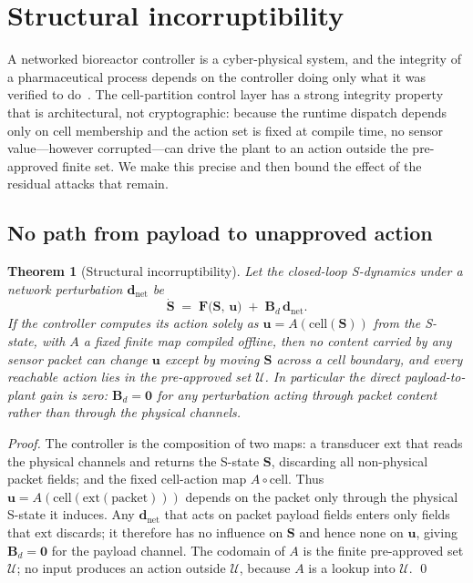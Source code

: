 \documentclass[11pt,a4paper,twocolumn]{article}
\theoremstyle{thmstyle}
\newtheorem{theorem}{Theorem}[section]
\theoremstyle{definition}
\theoremstyle{remark}
\newcommand{\Us}{\mathcal{U}}
\newcommand{\Ss}{\mathbf{S}}
\begin{document}
\section{Structural incorruptibility}
\label{sec:security}

A networked bioreactor controller is a cyber-physical system, and the
integrity of a pharmaceutical process depends on the controller doing
only what it was verified to do~\citep{fda2004pat,cardenas2008secure}.
The cell-partition control layer has a strong integrity property that is
architectural, not cryptographic: because the runtime dispatch depends
only on cell membership and the action set is fixed at compile time, no
sensor value---however corrupted---can drive the plant to an action
outside the pre-approved finite set. We make this precise and then bound
the effect of the residual attacks that remain.

\subsection{No path from payload to unapproved action}

\begin{theorem}[Structural incorruptibility]
\label{thm:incorr}
Let the closed-loop S-dynamics under a network perturbation
$\mathbf d_{\mathrm{net}}$ be
\begin{equation}
\label{eq:pert}
\dot{\Ss}\;=\;\mathbf F\bigl(\Ss,\,\mathbf u\bigr)\;+\;\mathbf B_d\,\mathbf d_{\mathrm{net}} .
\end{equation}
If the controller computes its action solely as
$\mathbf u=A(\mathrm{cell}(\Ss))$ from the S-state, with $A$ a fixed
finite map compiled offline, then no content carried by any sensor packet
can change $\mathbf u$ except by moving $\Ss$ across a cell boundary, and
every reachable action lies in the pre-approved set $\Us$. In particular
the direct payload-to-plant gain is zero: $\mathbf B_d=\mathbf 0$ for any
perturbation acting through packet content rather than through the
physical channels.
\end{theorem}

\begin{proof}
The controller is the composition of two maps: a transducer
$\mathrm{ext}$ that reads the physical channels and returns the S-state
$\Ss$, discarding all non-physical packet fields; and the fixed
cell-action map $A\circ\mathrm{cell}$. Thus
$\mathbf u=A(\mathrm{cell}(\mathrm{ext}(\text{packet})))$ depends on the
packet only through the physical S-state it induces. Any
$\mathbf d_{\mathrm{net}}$ that acts on packet payload fields enters only
fields that $\mathrm{ext}$ discards; it therefore has no influence on
$\Ss$ and hence none on $\mathbf u$, giving $\mathbf B_d=\mathbf 0$ for
the payload channel. The codomain of $A$ is the finite pre-approved set
$\Us$; no input produces an action outside $\Us$, because $A$ is a
lookup into $\Us$. \qed
\end{proof}
\end{document}
